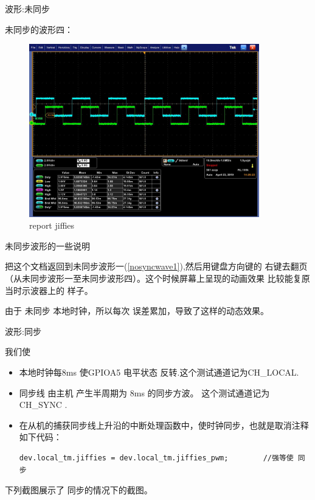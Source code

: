 \begin{frame}[fragile]{波形:未同步}

未同步的波形四：

  \begin{figure}[htbp]
  \begin{center}
  \includegraphics[width=10cm]{img/nosync4}
  \caption{report jiffies}
  \label{report}
  \end{center}
  \vspace{-0.5em}
  \end{figure}


\end{frame}


\begin{frame}[fragile]{未同步波形的一些说明}

把这个文档返回到未同步波形一(\ref{nosyncwave1}),然后用键盘方向键的
右键去翻页（从未同步波形一至未同步波形四）。这个时候屏幕上呈现的动画效果
比较能复原 当时示波器上的 样子。

由于 未同步 本地时钟，所以每次 误差累加，导致了这样的动态效果。

\end{frame}



\begin{frame}[fragile]{波形:同步}

我们使
\begin{itemize}
  \item 本地时钟每8ms 使GPIOA5 电平状态 反转.这个测试通道记为CH\_LOCAL.
  \item 同步线 由主机 产生半周期为 8ms 的同步方波。 这个测试通道记为CH\_SYNC .
  \item 在从机的捕获同步线上升沿的中断处理函数中，使时钟同步，也就是取消注释如下代码：
  \begin{lstlisting}
dev.local_tm.jiffies = dev.local_tm.jiffies_pwm;		//强等使 同步
  \end{lstlisting}

\end{itemize}


下列截图展示了 同步的情况下的截图。
\end{frame}


